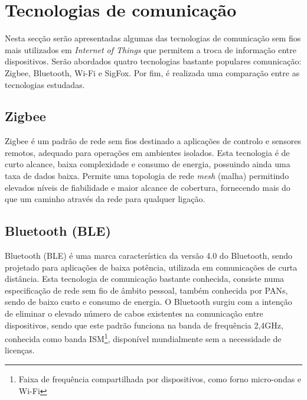 \section{Tecnologias de comunicação}
\label{state-tecc}
Nesta secção serão apresentadas algumas das tecnologias de comunicação sem fios mais utilizados em \textit{Internet of Things} que permitem a troca de informação entre dispositivos. Serão abordados quatro tecnologias bastante populares comunicação: Zigbee, Bluetooth, Wi-Fi e SigFox. Por fim, é realizada uma comparação entre as tecnologias estudadas. 



\subsection{Zigbee}


Zigbee é um padrão de rede sem fios destinado a aplicações de controlo e sensores remotos, adequado para operações em ambientes isolados. Esta tecnologia é de curto alcance, baixa complexidade e consumo de energia, possuindo ainda uma taxa de dados baixa. Permite uma topologia de rede \textit{mesh} (malha) permitindo elevados níveis de fiabilidade e maior alcance de cobertura, fornecendo mais do que um caminho através da rede para qualquer ligação\cite{Rahman2015}. 	




\subsection{Bluetooth (BLE)}


Bluetooth (BLE) é uma marca característica da versão 4.0 do Bluetooth, sendo projetado para aplicações de baixa potência, utilizada em comunicações de curta distância. Esta tecnologia de comunicação bastante conhecida, consiste numa especificação de rede sem fio de âmbito pessoal, também conhecida por \ac{PANs}, sendo de baixo custo e consumo de energia. O Bluetooth surgiu com a intenção de eliminar o elevado número de cabos existentes na comunicação entre dispositivos, sendo que este padrão funciona na banda de frequência 2,4GHz, conhecida como banda \ac{ISM}\footnote{Faixa de frequência compartilhada por dispositivos, como forno micro-ondas e Wi-Fi}, disponível mundialmente sem a necessidade de licenças\cite{Bruno2002}\cite{BluetoothTM2001}. 






